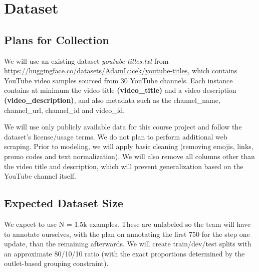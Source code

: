 \documentclass[11pt]{article}
\begin{document}
\section{Dataset}

\subsection{Plans for Collection}
We will use an existing dataset \textit{youtube-titles.txt} from \url{https://huggingface.co/datasets/AdamLucek/youtube-titles}, which contains YouTube video samples sourced from 30 YouTube channels. 
Each instance contains at minimum the video title \textbf{(video\_title)} and a video description \textbf{(video\_description)}, and also metadata such as the channel\_name, channel\_url, channel\_id and video\_id.

We will use only publicly available data for this course project and follow the dataset's license/usage terms.
We do not plan to perform additional web scraping. Prior to modeling, we will apply basic cleaning
(removing emojis, links, promo codes and text normalization). We will also remove all columns other than the video title and description, which will prevent generalization based on the YouTube channel itself.

\subsection{Expected Dataset Size}
We expect to use N = 1.5k examples. These are unlabeled so the team will have to annotate ourselves, with the plan on annotating the first 750 for the step one update, than the remaining afterwards.
We will create train/dev/test splits with an approximate 80/10/10 ratio (with the exact proportions determined by the outlet-based grouping constraint).
\end{document}

